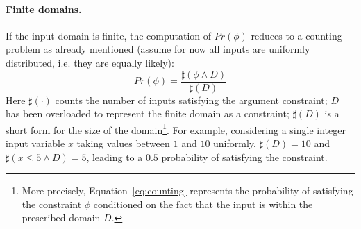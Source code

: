 %		

\paragraph{Finite domains.} 

If the input domain is finite, the computation of $Pr(\phi)$ reduces to a counting problem as already mentioned (assume for now all inputs are uniformly distributed, i.e. they are equally likely):
%
\begin{equation}\label{eq:counting}
	Pr(\phi) = \frac{\sharp(\phi \land D)}{\sharp(D)}
\end{equation}
%
\noindent Here $\sharp(\cdot)$ counts the number of inputs satisfying the argument constraint; $D$ has been overloaded to represent the finite domain as a constraint; $\sharp(D)$ is a short form for the size of the domain\footnote{More precisely, Equation~\eqref{eq:counting} represents the probability of satisfying the constraint $\phi$ conditioned on the fact that the input is within the prescribed domain $D$.}. For example, considering a single integer input variable $x$ taking values between $1$ and $10$ uniformly, $\sharp(D)=10$ and $\sharp(x\leq5 \land D)=5$, leading to a $0.5$ probability of satisfying the constraint.

